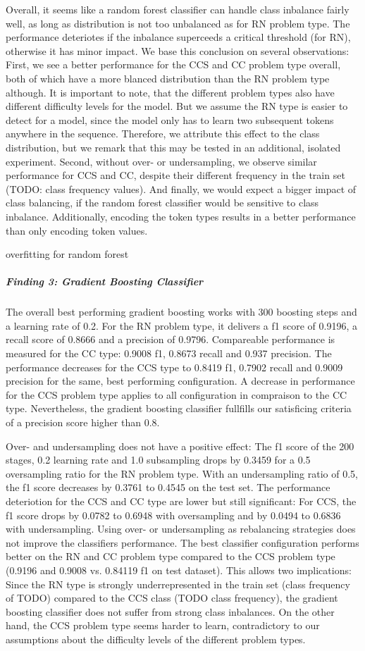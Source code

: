 Overall, it seems like a random forest classifier can handle class inbalance fairly well, as long as distribution is not too unbalanced as for RN problem type. The performance deteriotes if the inbalance superceeds a critical threshold (for RN), otherwise it has minor impact.
We base this conclusion on several observations: First, we see a better performance for the CCS and CC problem type overall, both of which have a more blanced distribution than the RN problem type although. It is important to note, that the different problem types also have different difficulty levels for the model. But we assume the RN type is easier to detect for a model, since the model only has to learn two subsequent tokens anywhere in the sequence. Therefore, we attribute this effect to the class distribution, but we remark that this may be tested in an additional, isolated experiment. Second, without over- or undersampling, we observe similar performance for CCS and CC, despite their different frequency in the train set (TODO: class frequency values). And finally, we would expect a bigger impact of class balancing, if the random forest classifier would be sensitive to class inbalance.
Additionally, encoding the token types results in a better performance than only encoding token values.

overfitting for random forest

\subparagraph{Finding 3: Gradient Boosting Classifier}
The overall best performing gradient boosting works with 300 boosting steps and a learning rate of 0.2. For the RN problem type, it delivers a f1 score of 0.9196, a recall score of 0.8666 and a precision of 0.9796. Compareable performance is measured for the CC type: 0.9008 f1, 0.8673 recall and 0.937 precision. The performance decreases for the CCS type to 0.8419 f1, 0.7902 recall and 0.9009 precision for the same, best performing configuration. A decrease in performance for the CCS problem type applies to all configuration in compraison to the CC type. Nevertheless, the gradient boosting classifier fullfills our satisficing criteria of a precision score higher than 0.8.

Over- and undersampling does not have a positive effect: The f1 score of the 200 stages, 0.2 learning rate and 1.0 subsampling drops by 0.3459 for a 0.5 oversampling ratio for the RN problem type. With an undersampling ratio of 0.5, the f1 score decreases by 0.3761 to 0.4545 on the test set. The performance deteriotion for the CCS and CC type are lower but still significant: For CCS, the f1 score drops by 0.0782 to 0.6948 with oversampling and by 0.0494 to 0.6836 with undersampling. Using over- or undersampling as rebalancing strategies does not improve the classifiers performance. The best classifier configuration performs better on the RN and CC problem type compared to the CCS problem type (0.9196 and 0.9008 vs. 0.84119 f1 on test dataset). This allows two implications: Since the RN type is strongly underrepresented in the train set (class frequency of TODO) compared to the CCS class (TODO class frequency), the gradient boosting classifier does not suffer from strong class inbalances. On the other hand, the CCS problem type seems harder to learn, contradictory to our assumptions about the difficulty levels of the different problem types.

